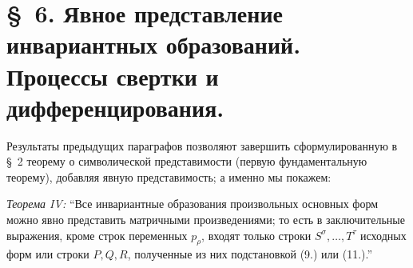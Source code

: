 \documentclass[11pt]{article}
\begin{document}
\section*{\S\ 6. Явное представление инвариантных образований.\\Процессы свертки и дифференцирования.}

Результаты предыдущих параграфов позволяют завершить сформулированную в \S\ 2 теорему о символической представимости (первую фундаментальную теорему), добавляя явную представимость; а именно мы покажем:

\emph{Теорема IV:} ``Все инвариантные образования произвольных основных форм можно явно представить матричными произведениями; то есть в заключительные выражения, кроме строк переменных $p_\rho$, входят только строки $S^\sigma,\ldots,T^\tau$ исходных форм или строки $P,Q,R$, полученные из них подстановкой (9.) или (11.).''
\end{document}
